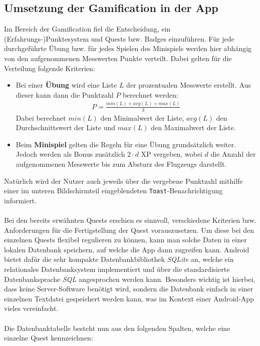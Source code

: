 \subsection{Umsetzung der Gamification in der App}
Im Bereich der Gamification fiel die Entscheidung, ein (Erfahrungs-)Punktesystem und Quests bzw. Badges einzuführen. Für jede durchgeführte Übung bzw. für jedes Spielen des Minispiels werden hier abhängig von den aufgenommenen Messwerten Punkte verteilt. Dabei gelten für die Verteilung folgende Kriterien:
\begin{itemize}
	\item Bei einer \textbf{Übung} wird eine Liste $L$ der prozentualen Messwerte erstellt. Aus dieser kann dann die Punktzahl $P$ berechnet werden:
	\begin{align*}
	P = \frac{min(L) + avg(L) + max(L)}{3}
	\end{align*}
	Dabei berechnet $min(L)$ den Minimalwert der Liste, $avg(L)$ den Durchschnittswert der Liste und $max(L)$ den Maximalwert der Liste.
	\item Beim \textbf{Minispiel} gelten die Regeln für eine Übung grundsätzlich weiter. Jedoch werden als Bonus zusätzlich $2 \cdot d$ XP vergeben, wobei $d$ die Anzahl der aufgenommenen Messwerte bis zum Absturz des Flugzeugs darstellt.
\end{itemize}
Natürlich wird der Nutzer auch jeweils über die vergebene Punktzahl mithilfe einer im unteren Bildschirmteil eingeblendeten \texttt{Toast}-Benachrichtigung informiert. \\ \\
Bei den bereits erwähnten Quests erschien es sinnvoll, verschiedene Kriterien bzw. Anforderungen für die Fertigstellung der Quest vorauszusetzen. Um diese bei den einzelnen Quests flexibel regulieren zu können, kann man solche Daten in einer lokalen Datenbank speichern, auf welche die App dann zugreifen kann. Android bietet dafür die sehr kompakte Datenbankbibliothek \textit{SQLite} an, welche ein relationales Datenbanksystem implementiert und über die standardisierte Datenbanksprache \textit{SQL} angesprochen werden kann.\cite{Src:AndroidKuenneth} Besonders wichtig ist hierbei, dass keine Server-Software benötigt wird, sondern die Datenbank einfach in einer einzelnen Textdatei gespeichert werden kann, was im Kontext einer Android-App vieles vereinfacht.\cite{Src:AndroidKuenneth} \\ \\
Die Datenbanktabelle besteht nun aus den folgenden Spalten, welche eine einzelne Quest kennzeichnen:
